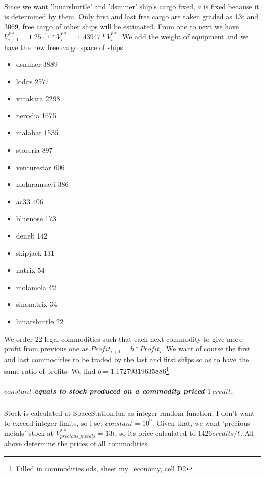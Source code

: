 \documentclass[]{article}
\begin{document}
Since we want 'lunarshuttle' and 'dsminer' ship's cargo fixed, $a$ is fixed because it is determined by them.
Only first and last free cargo are taken graded as 13t and 3069, free cargo of other ships will be estimated. From one to next we have $V^{**}_{i+1}=1.25^{\tfrac{a}{a-1}}*V^{**}_{i}=1.43947*V^{**}_{i}$. We add the weight of equipment and we have the new free cargo space of ships
\begin{itemize}
	\item dsminer	3889
\item 	lodos	2577
	
\item 	vatakara	2298
\item 	nerodia	1675
	
\item 	malabar	1535
\item 	storeria	897
\item 	venturestar	606
	
\item 	molaramsayi	386
\item 	ac33	406
	
\item 	bluenose	173
\item 	deneb	142
\item 	skipjack	131
	
\item 	natrix	54
	
\item 	molamola	42
\item 	sinonatrix	34
\item 	lunarshuttle	22	
\end{itemize}
We order 22 legal commodities such that each next commodity to give more profit from previous one as $Profit_{i+1}=b*Profit_{i}$. We want of course the first and last commodities to be traded by the last and first ships so as to have the same ratio of profits.  We find $b=1.17279319635886$\footnote{Filled in commodities.ods, sheet my\_economy, cell D2}.
\subparagraph{$constant$ equals to stock produced on a commodity priced $1\,credit$.} Stock is calculated at SpaceStation.lua as integer random function. I don't want to exceed integer limits, so i set $constant=10^9$. Given that, we want 'precious metals' stock at $V^{**}_{precious\_metals}=13t$, so its price calculated to $1426 credits/t$. All above determine the prices of all commodities.
\end{document}
